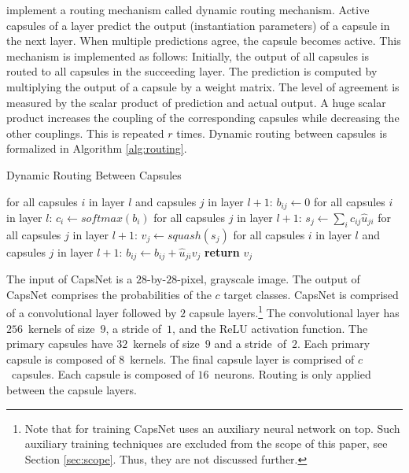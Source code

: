 \par
\cite{Sabour.2017} implement a routing mechanism called dynamic routing mechanism. Active capsules of a layer predict the output (instantiation parameters) of a capsule in the next layer. When multiple predictions agree, the capsule becomes active.
This mechanism is implemented as follows: Initially, the output of all capsules is routed to all capsules in the succeeding layer. The prediction is computed by multiplying the output of a capsule by a weight matrix. The level of agreement is measured by the scalar product of prediction and actual output. A huge scalar product increases the coupling of the corresponding capsules while decreasing the other couplings. This is repeated $r$ times. Dynamic routing between capsules is formalized in Algorithm \ref{alg:routing}. \autocite{Sabour.2017}
\begin{algorithm}[H]
	\caption{Dynamic Routing Between Capsules}
	\label{alg:routing}
	\begin{algorithmic}[1]
			\State for all capsules $i$ in layer $l$ and capsules $j$ in layer $l+1$: $b_{ij} \gets 0$
				\State for all capsules $i$ in layer $l$: $c_i \gets softmax(b_i)$
				\State for all capsules $j$ in layer $l+1$: $s_j \gets \sum_{i} c_{ij} \hat{u}_{ji}$
				\State for all capsules $j$ in layer $l+1$: $v_j \gets squash(s_j)$
				\State for all capsules $i$ in layer $l$ and  capsules $j$ in layer $l+1$: $b_{ij} \gets b_{ij} + \hat{u}_{ji} v_j$
			\EndFor
			\State \textbf{return} $v_j$
		\EndProcedure
	\end{algorithmic}
\end{algorithm}
\par
The input of CapsNet is a $28$-by-$28$-pixel, grayscale image. The output of CapsNet comprises the probabilities of the $c$ target classes. 
CapsNet is comprised of a convolutional layer followed by $2$ capsule layers.\footnote{Note that for training CapsNet uses an auxiliary neural network on top. Such auxiliary training techniques are excluded from the scope of this paper, see Section \ref{sec:scope}. Thus, they are not discussed further.}
%
The convolutional layer has $256$~kernels of size~$9$, a stride of~$1$, and the \ac{ReLU} activation function.
The primary capsules have $32$~kernels of size~$9$ and a stride~of~$2$. Each primary capsule is composed of $8$~kernels. The final capsule layer is comprised of $c$~capsules. Each capsule is composed of $16$~neurons.  Routing is only applied between the capsule layers. \autocite{Sabour.2017}